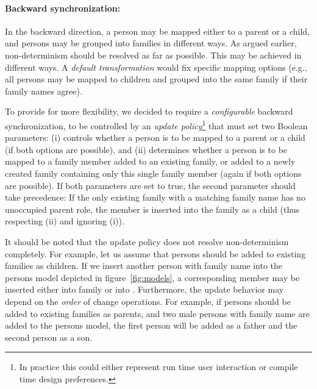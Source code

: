 \paragraph{Backward synchronization:}

In the backward direction, a person may be mapped either to a parent or a child, and persons may be grouped into families in different ways. As argued earlier, non-determinism should be resolved as far as possible. This may be achieved in different ways. A \emph{default transformation} would fix specific mapping options (e.g., all persons may be mapped to children and grouped into the same family if their family names agree). 

To provide for more flexibility, we decided to require a \emph{configurable} backward synchronization, to be controlled by an \emph{update policy}\footnote{In practice this could either represent run time user interaction or compile time design preferences.} that must set two Boolean parameters:
(i)  controls whether a person is to be mapped to a parent or a child (if both options are possible), and (ii)  determines whether a person is to be mapped to a family member added to an existing family, or added to a newly created family containing only this single family member (again if both options are possible). 
If both parameters are set to true, the second parameter should take precedence: If the only existing family with a matching family name has no unoccupied parent role, the member is inserted into the family as a child (thus respecting (ii) and ignoring (i)).

It should be noted that the update policy does not resolve non-determinism completely.
For example, let us assume that persons should be added to existing families as children.
If we insert another person with family name  into the persons model depicted in figure~\ref{fig:models}, a corresponding member may be inserted either into family  or into .
Furthermore, the update behavior may depend on the \emph{order} of change operations. For example, if persons should be added to existing families as parents, and two male persons with family name  are added to the persons model, the first person will be added as a father and the second person as a son. 

